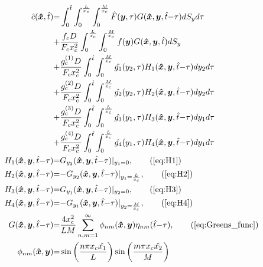 \documentclass[\main/thesis.tex]{subfiles}
\begin{document}
\begin{align}
\hat{c}(\boldsymbol{\hat{x}}, \hat{t}) &{=} \int_{0}^{\hat{t}} \int_{0}^{\frac{L}{x_c}} \int_{0}^{\frac{M}{x_c}} \hat{F}(\boldsymbol{y}, \tau) G(\boldsymbol{\hat{x}}, \boldsymbol{y}, \hat{t}{-}\tau) dS_y d\tau \nonumber\\
               &{+} \frac{f_c D}{F_c x_c^2} \int_{0}^{\frac{L}{x_c}} \int_{0}^{\frac{M}{x_c}} f(\boldsymbol{y}) G(\boldsymbol{\hat{x}}, \boldsymbol{y}, \hat{t}) dS_y \nonumber\\
               &{+} \frac{g_c^{(1)} D}{F_c x_c^2} \int_{0}^{\hat{t}} \int_{0}^{\frac{M}{x_c}} \hat{g_1}(y_2, \tau) H_1(\boldsymbol{\hat{x}}, \boldsymbol{y}, \hat{t}{-}\tau) dy_2 d\tau \label{eq:carcin_sol}\\
               &{+} \frac{g_c^{(2)} D}{F_c x_c^2} \int_{0}^{\hat{t}} \int_{0}^{\frac{M}{x_c}} \hat{g_2}(y_2, \tau) H_2(\boldsymbol{\hat{x}}, \boldsymbol{y}, \hat{t}{-}\tau) dy_2 d\tau \nonumber\\
               &{+} \frac{g_c^{(3)} D}{F_c x_c^2} \int_{0}^{\hat{t}} \int_{0}^{\frac{L}{x_c}} \hat{g_3}(y_1, \tau) H_3(\boldsymbol{\hat{x}}, \boldsymbol{y}, \hat{t}{-}\tau) dy_1 d\tau \nonumber\\
               &{+} \frac{g_c^{(4)} D}{F_c x_c^2} \int_{0}^{\hat{t}} \int_{0}^{\frac{L}{x_c}} \hat{g_4}(y_1, \tau) H_4(\boldsymbol{\hat{x}}, \boldsymbol{y}, \hat{t}{-}\tau) dy_1 d\tau \nonumber\\
H_1(\boldsymbol{\hat{x}}, \boldsymbol{y}, \hat{t}{-}\tau) &{=} G_{y_2}(\boldsymbol{\hat{x}}, \boldsymbol{y}, \hat{t}{-}\tau) |_{y_1{=}0}, \tag{\ref{eq:H1}}\\
H_2(\boldsymbol{\hat{x}}, \boldsymbol{y}, \hat{t}{-}\tau) &{=} {-} G_{y_2}(\boldsymbol{\hat{x}}, \boldsymbol{y}, \hat{t}{-}\tau) |_{y_1{=}\frac{L}{x_c}}, \tag{\ref{eq:H2}}\\
H_3(\boldsymbol{\hat{x}}, \boldsymbol{y}, \hat{t}{-}\tau) &{=} G_{y_1}(\boldsymbol{\hat{x}}, \boldsymbol{y}, \hat{t}{-}\tau) |_{y_2{=}0}, \tag{\ref{eq:H3}}\\
H_4(\boldsymbol{\hat{x}}, \boldsymbol{y}, \hat{t}{-}\tau) &{=} {-} G_{y_1}(\boldsymbol{\hat{x}}, \boldsymbol{y}, \hat{t}{-}\tau) |_{y_2{=}\frac{M}{x_c}}, \tag{\ref{eq:H4}}\\
G(\boldsymbol{\hat{x}}, \boldsymbol{y}, \hat{t}{-}\tau) &{=} \frac{4 x_c^2}{LM} \sum_{n, m {=} 1}^{\infty} \phi_{nm}(\boldsymbol{\hat{x}}, \boldsymbol{y}) \eta_{nm}(\hat{t}{-}\tau), \tag{\ref{eq:Greens_func}}\\
\phi_{nm}(\boldsymbol{\hat{x}}, \boldsymbol{y}) &{=} \sin\left(\frac{n \pi x_c \hat{x_1}}{L}\right)\sin\left(\frac{m \pi x_c \hat{x_2}}{M}\right)

\end{align}
\end{document}
